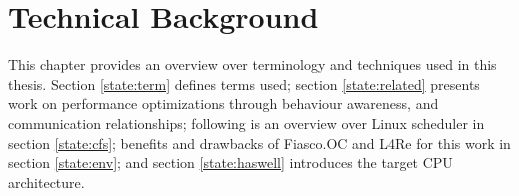 \chapter{Technical Background}
\label{sec:state}







This chapter provides an overview over terminology and techniques used in this
thesis.
Section \ref{state:term} defines terms used;
section \ref{state:related} presents work on performance optimizations
through behaviour awareness, and communication relationships;
following is an overview over Linux scheduler in section \ref{state:cfs};
benefits and drawbacks of Fiasco.OC and L4Re for this work in section
\ref{state:env};
and section \ref{state:haswell} introduces the target CPU architecture.













\cleardoublepage

